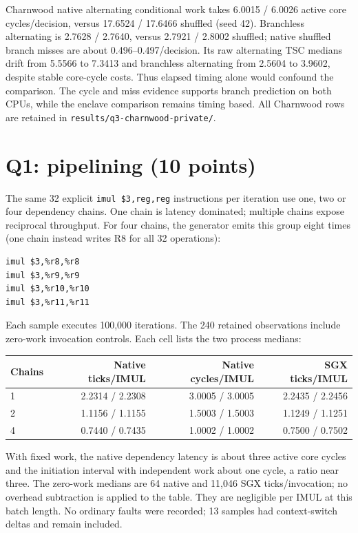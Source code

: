 \documentclass[11pt]{article}
\begin{document}
Charnwood native alternating conditional work takes 6.0015 / 6.0026 active core cycles/decision, versus 17.6524 / 17.6466 shuffled (seed 42). Branchless alternating is 2.7628 / 2.7640, versus 2.7921 / 2.8002 shuffled; native shuffled branch misses are about 0.496--0.497/decision. Its raw alternating TSC medians drift from 5.5566 to 7.3413 and branchless alternating from 2.5604 to 3.9602, despite stable core-cycle costs. Thus elapsed timing alone would confound the comparison. The cycle and miss evidence supports branch prediction on both CPUs, while the enclave comparison remains timing based. All Charnwood rows are retained in \texttt{results/q3-charnwood-private/}.

\section{Q1: pipelining (10 points)}
The same 32 explicit \texttt{imul \$3,reg,reg} instructions per iteration use one, two or four dependency chains. One chain is latency dominated; multiple chains expose reciprocal throughput. For four chains, the generator emits this group eight times (one chain instead writes R8 for all 32 operations):
\begin{verbatim}
imul $3,%r8,%r8
imul $3,%r9,%r9
imul $3,%r10,%r10
imul $3,%r11,%r11
\end{verbatim}
Each sample executes 100,000 iterations. The 240 retained observations include zero-work invocation controls. Each cell lists the two process medians:
\begin{center}\begin{tabular}{lrrr}
Chains & Native ticks/IMUL & Native cycles/IMUL & SGX ticks/IMUL\\\hline
1 & 2.2314 / 2.2308 & 3.0005 / 3.0005 & 2.2435 / 2.2456\\
2 & 1.1156 / 1.1155 & 1.5003 / 1.5003 & 1.1249 / 1.1251\\
4 & 0.7440 / 0.7435 & 1.0002 / 1.0002 & 0.7500 / 0.7502
\end{tabular}\end{center}
With fixed work, the native dependency latency is about three active core cycles and the initiation interval with independent work about one cycle, a ratio near three. The zero-work medians are 64 native and 11,046 SGX ticks/invocation; no overhead subtraction is applied to the table. They are negligible per IMUL at this batch length. No ordinary faults were recorded; 13 samples had context-switch deltas and remain included.
\end{document}
